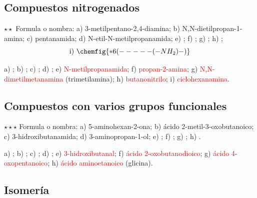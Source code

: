 \subsection{Compuestos nitrogenados}

\begin{exercise}
    \(\star\star\) Formula o nombra: a) 3-metilpentano-2,4-diamina; b) N,N-dietilpropan-1-amina; c) pentanamida; d)
    N-etil-N-metilpropanamida; e) ; f) ; g) ; h) ;
    \[ \text{i)}\ \chemfig{*6(-----(-NH_2)-)} \]
    \begin{solu}
        a) \textcolor{red}{}; b) \textcolor{red}{};
        c) \textcolor{red}{}; d) \textcolor{red}{};
        e) \textcolor{red}{N-metilpropanamida}; f) \textcolor{red}{propan-2-amina}; g) \textcolor{red}{N,N-dimetilmetanamina}
        (trimetilamina); h) \textcolor{red}{butanonitrilo}; i) \textcolor{red}{ciclohexanamina}.
    \end{solu}
\end{exercise}

\subsection{Compuestos con varios grupos funcionales}

\begin{exercise}
    \(\star\star\star\) Formula o nombra: a) 5-aminohexan-2-ona; b) ácido 2-metil-3-oxobutanoico; c) 3-hidroxibutanamida;
    d) 3-aminopropan-1-ol; e) ; f) ; g) ;
    h) .
    \begin{solu}
        a) \textcolor{red}{}; b) \textcolor{red}{};
        c) \textcolor{red}{}; d) \textcolor{red}{}; e) \textcolor{red}{3-hidroxibutanal};
        f) \textcolor{red}{ácido 2-oxobutanodioico}; g) \textcolor{red}{ácido 4-oxopentanoico}; h) \textcolor{red}{ácido
        aminoetanoico} (glicina).
    \end{solu}
\end{exercise}

\subsection{Isomería}

